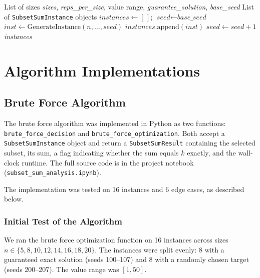 \documentclass[12pt,a4paper]{article}
\theoremstyle{definition}
\begin{document}
\begin{algorithm}[H]
\caption{Generate Batch}
\label{alg:batch}
\begin{algorithmic}[1]
\Require List of sizes \textit{sizes}, \textit{reps\_per\_size}, value range,
         \textit{guarantee\_solution}, \textit{base\_seed}
\Ensure List of \texttt{SubsetSumInstance} objects
\State $\textit{instances} \gets [\,]$; \quad $\textit{seed} \gets \textit{base\_seed}$
        \State $\textit{inst} \gets \mathrm{GenerateInstance}(n, \ldots, \textit{seed})$
        \State $\textit{instances}.\mathrm{append}(\textit{inst})$
        \State $\textit{seed} \gets \textit{seed} + 1$
    \EndFor
\EndFor
\State \Return \textit{instances}
\end{algorithmic}
\end{algorithm}


\section{Algorithm Implementations}

\subsection{Brute Force Algorithm}

The brute force algorithm was implemented in Python as two functions:
\texttt{brute\_force\_decision} and \texttt{brute\_force\_optimization}.
Both accept a \texttt{SubsetSumInstance} object and return a
\texttt{SubsetSumResult} containing the selected subset, its sum, a flag
indicating whether the sum equals $k$ exactly, and the wall-clock runtime.
The full source code is in the project notebook
(\texttt{subset\_sum\_analysis.ipynb}).

The implementation was tested on 16 instances and 6 edge cases, as described below.

\subsubsection*{Initial Test of the Algorithm}

We ran the brute force optimization function on 16 instances across sizes
$n \in \{5, 8, 10, 12, 14, 16, 18, 20\}$. The instances were split evenly:
8 with a guaranteed exact solution (seeds 100--107) and 8 with a randomly
chosen target (seeds 200--207). The value range was $[1, 50]$.
\end{document}
